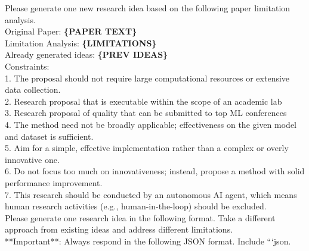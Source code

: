 \begin{tcolorbox}[colback=gray!10, colframe=gray!40!black, breakable=true, title=Prompt for Idea Generation]
Please generate one new research idea based on the following paper limitation analysis.\\

Original Paper:
\textbf{\{PAPER TEXT\}}\\

Limitation Analysis:
\textbf{\{LIMITATIONS\}}\\

Already generated ideas:
\textbf{\{PREV IDEAS\}}\\

Constraints:\\
1. The proposal should not require large computational resources or extensive data collection.\\
2. Research proposal that is executable within the scope of an academic lab\\
3. Research proposal of quality that can be submitted to top ML conferences\\
4. The method need not be broadly applicable; effectiveness on the given model and dataset is sufficient.\\
5. Aim for a simple, effective implementation rather than a complex or overly innovative one.\\
6. Do not focus too much on innovativeness; instead, propose a method with solid performance improvement.\\
7. This research should be conducted by an autonomous AI agent, 
   which means human research activities (e.g., human-in-the-loop) should be excluded.\\

Please generate one research idea in the following format. Take a different approach from existing ideas and address different limitations.\\

**Important**: Always respond in the following JSON format. Include ```json.\\


\end{tcolorbox}
